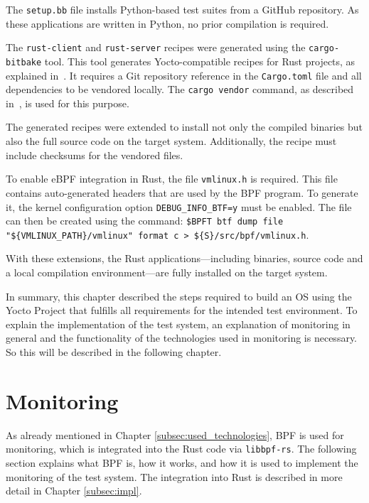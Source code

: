 The \texttt{setup.bb} file installs Python-based test suites from a GitHub repository.  
As these applications are written in Python, no prior compilation is required.

The \texttt{rust-client} and \texttt{rust-server} recipes were generated using the \texttt{cargo-bitbake} tool.  
This tool generates Yocto-compatible recipes for Rust projects, as explained in~\cite{cargo-bitbake}.  
It requires a Git repository reference in the \texttt{Cargo.toml} file and all dependencies to be vendored locally.  
The \texttt{cargo vendor} command, as described in~\cite{vendor}, is used for this purpose.

The generated recipes were extended to install not only the compiled binaries but also the full source code on the target system.  
Additionally, the recipe must include checksums for the vendored files.  

To enable eBPF integration in Rust, the file \texttt{vmlinux.h} is required.  
This file contains auto-generated headers that are used by the BPF program.  
To generate it, the kernel configuration option \texttt{DEBUG\_INFO\_BTF=y} must be enabled.  
The file can then be created using the command:  
\texttt{\$BPFT btf dump file "\$\{VMLINUX\_PATH\}/vmlinux" format c > \$\{S\}/src/bpf/vmlinux.h}.  

With these extensions, the Rust applications—including binaries, source code and a local compilation environment—are fully installed on the target system.

In summary, this chapter described the steps required to build an \ac{OS} using the Yocto Project that fulfills all requirements for the intended test environment.  
To explain the implementation of the test system, an explanation of monitoring in general and the functionality of the technologies used in monitoring is necessary.
So this will be described in the following chapter.

\section{Monitoring} \label{subsec:monitoring}
As already mentioned in Chapter \ref{subsec:used_technologies}, \ac{BPF} is used for monitoring, which is integrated into the Rust code via \texttt{libbpf-rs}.  
The following section explains what \ac{BPF} is, how it works, and how it is used to implement the monitoring of the test system.  
The integration into Rust is described in more detail in Chapter \ref{subsec:impl}.  


